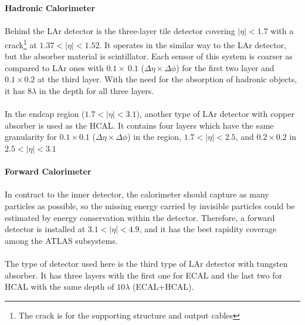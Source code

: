 \\
\\{\bf Hadronic Calorimeter}
\\
\\Behind the LAr detector is the three-layer tile detector covering $|\eta|<1.7$ with a crack\footnote{The crack is for the supporting structure and output cables} at $1.37<|\eta|<1.52$. It operates in the similar way to the LAr detector, but the absorber material is scintillator. Each sensor of this system is coarser as compared to LAr ones with $0.1 \times ~0.1$ ($\Delta \eta \times \Delta \phi$) for the first two layer and $0.1 \times 0.2$ at the third layer. With the need for the absorption of hadronic objects, it has $8 \lambda$ in the depth for all three layers.
\\
\\In the endcap region ($1.7<|\eta|<3.1$), another type of LAr detector with copper absorber is used as the HCAL. It contains four layers which have the same granularity for $0.1 \times 0.1$ ($\Delta \eta \times \Delta \phi$) in the region, $1.7<|\eta|<2.5$, and $0.2 \times 0.2$ in $2.5<|\eta|<3.1$
\\
\\{\bf Forward Calorimeter}
\\
\\In contract to the inner detector, the calorimeter should capture as many particles as possible, so the missing energy carried by invisible particles could be estimated by energy conservation within the detector. Therefore, a forward detector is installed at $3.1<|\eta|<4.9$, and it has the best rapidity coverage among the ATLAS subsystems. 
\\
\\The type of detector used here is the third type of LAr detector with tungsten absorber. It has three layers with the first one for ECAL and the last two for HCAL with the same depth of $10\lambda$ (ECAL+HCAL).  
